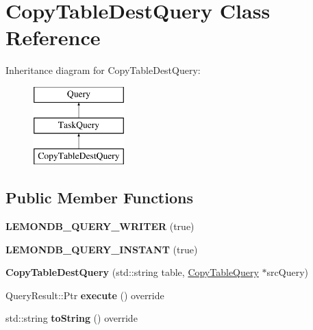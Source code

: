 \hypertarget{class_copy_table_dest_query}{}\section{Copy\+Table\+Dest\+Query Class Reference}
\label{class_copy_table_dest_query}
Inheritance diagram for Copy\+Table\+Dest\+Query\+:\begin{figure}[H]
\begin{center}
\leavevmode
\includegraphics[height=3.000000cm]{class_copy_table_dest_query}
\end{center}
\end{figure}
\subsection*{Public Member Functions}
\begin{DoxyCompactItemize}
\item 
\mbox{\label{class_copy_table_dest_query_a0330ab9aec75378c99446501fac4e7f8}} 
{\bfseries L\+E\+M\+O\+N\+D\+B\+\_\+\+Q\+U\+E\+R\+Y\+\_\+\+W\+R\+I\+T\+ER} (true)
\item 
\mbox{\label{class_copy_table_dest_query_a265356fa4dc7ee9e8fb4acf20a3aec3c}} 
{\bfseries L\+E\+M\+O\+N\+D\+B\+\_\+\+Q\+U\+E\+R\+Y\+\_\+\+I\+N\+S\+T\+A\+NT} (true)
\item 
\mbox{\label{class_copy_table_dest_query_a3e78494953a88aeed13c482d1f426778}} 
{\bfseries Copy\+Table\+Dest\+Query} (std\+::string table, \hyperlink{class_copy_table_query}{Copy\+Table\+Query} $\ast$src\+Query)
\item 
\mbox{\label{class_copy_table_dest_query_aebf279d8567c5a6124ac151a67f757b3}} 
Query\+Result\+::\+Ptr {\bfseries execute} () override
\item 
\mbox{\label{class_copy_table_dest_query_a87dbf6553887c701dadb613ed1501e34}} 
std\+::string {\bfseries to\+String} () override
\end{DoxyCompactItemize}
